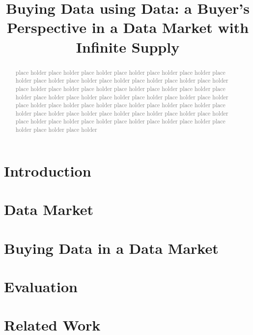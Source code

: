 \documentclass[sigconf,anonymous,review]{acmart}
\newcommand{\todo}[1]{\textcolor{gray}{{#1}}} %
\begin{document}
	\title{Buying Data using Data: a Buyer's Perspective in a Data Market with Infinite Supply}
	
	\begin{abstract}
	\todo{place holder place holder place holder place holder place holder place holder}
	\todo{place holder place holder place holder place holder place holder place holder}
	\todo{place holder place holder place holder place holder place holder place holder}
	\todo{place holder place holder place holder place holder place holder place holder}
	\todo{place holder place holder place holder place holder place holder place holder}
	\todo{place holder place holder place holder place holder place holder place holder}
	\todo{place holder place holder place holder place holder place holder place holder}
	\todo{place holder place holder place holder place holder place holder place holder}
	\end{abstract}
	\maketitle
	
	\section{Introduction}\label{sec:introduction}
	
	\section{Data Market}\label{sec:datamarket}
	
	\section{Buying Data in a Data Market}\label{sec:model}
	
	\section{Evaluation}\label{sec:eval}
	
	\section{Related Work}\label{sec:related}
	
	
	
	
\end{document}
